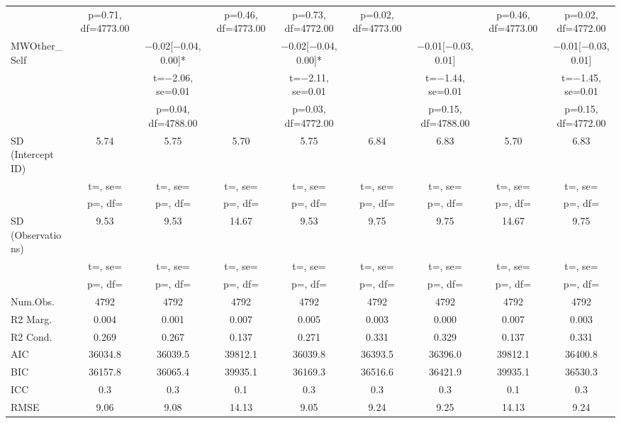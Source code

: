 \documentclass[]{report}
\begin{document}
\begin{table}
{\begin{tabular}[t]{lcccccccc}
		& p=\num{0.71}, df=\num{4773.00} &  & p=\num{0.46}, df=\num{4773.00} & p=\num{0.73}, df=\num{4772.00} & p=\num{0.02}, df=\num{4773.00} &  & p=\num{0.46}, df=\num{4773.00} & p=\num{0.02}, df=\num{4772.00}\\
		MWOther\_Self &  & \num{-0.02}[\num{-0.04},\num{0.00}]* &  & \num{-0.02}[\num{-0.04},\num{0.00}]* &  & \num{-0.01}[\num{-0.03},\num{0.01}] &  & \num{-0.01}[\num{-0.03},\num{0.01}]\\
		&  & t=\num{-2.06}, se=\num{0.01} &  & t=\num{-2.11}, se=\num{0.01} &  & t=\num{-1.44}, se=\num{0.01} &  & t=\num{-1.45}, se=\num{0.01}\\
		&  & p=\num{0.04}, df=\num{4788.00} &  & p=\num{0.03}, df=\num{4772.00} &  & p=\num{0.15}, df=\num{4788.00} &  & p=\num{0.15}, df=\num{4772.00}\\
		SD (Intercept ID) & \num{5.74} & \num{5.75} & \num{5.70} & \num{5.75} & \num{6.84} & \num{6.83} & \num{5.70} & \num{6.83}\\
		& t=, se= & t=, se= & t=, se= & t=, se= & t=, se= & t=, se= & t=, se= & t=, \vphantom{1} se=\\
		& p=, df= & p=, df= & p=, df= & p=, df= & p=, df= & p=, df= & p=, df= & p=, \vphantom{1} df=\\
		SD (Observations) & \num{9.53} & \num{9.53} & \num{14.67} & \num{9.53} & \num{9.75} & \num{9.75} & \num{14.67} & \num{9.75}\\
		& t=, se= & t=, se= & t=, se= & t=, se= & t=, se= & t=, se= & t=, se= & t=, se=\\
		& p=, df= & p=, df= & p=, df= & p=, df= & p=, df= & p=, df= & p=, df= & p=, df=\\
		\midrule
		Num.Obs. & \num{4792} & \num{4792} & \num{4792} & \num{4792} & \num{4792} & \num{4792} & \num{4792} & \num{4792}\\
		R2 Marg. & \num{0.004} & \num{0.001} & \num{0.007} & \num{0.005} & \num{0.003} & \num{0.000} & \num{0.007} & \num{0.003}\\
		R2 Cond. & \num{0.269} & \num{0.267} & \num{0.137} & \num{0.271} & \num{0.331} & \num{0.329} & \num{0.137} & \num{0.331}\\
		AIC & \num{36034.8} & \num{36039.5} & \num{39812.1} & \num{36039.8} & \num{36393.5} & \num{36396.0} & \num{39812.1} & \num{36400.8}\\
		BIC & \num{36157.8} & \num{36065.4} & \num{39935.1} & \num{36169.3} & \num{36516.6} & \num{36421.9} & \num{39935.1} & \num{36530.3}\\
		ICC & \num{0.3} & \num{0.3} & \num{0.1} & \num{0.3} & \num{0.3} & \num{0.3} & \num{0.1} & \num{0.3}\\
		RMSE & \num{9.06} & \num{9.08} & \num{14.13} & \num{9.05} & \num{9.24} & \num{9.25} & \num{14.13} & \num{9.24}\\
		\bottomrule
	\end{tabular}}
\end{table}
\end{document}
